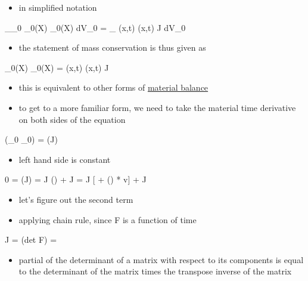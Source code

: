 \documentclass[11pt]{article}
\begin{document}
\begin{itemize}
\item in simplified notation
\end{itemize}
\int _{\omega_0} \rho_0(X) \phi_0(X) dV_0 = \int _{\omega} \rho(x,t) \phi(x,t) J dV_0
\begin{itemize}
\item the statement of mass conservation is thus given as
\end{itemize}
\rho_0(X) \phi_0(X) = \rho(x,t) \phi(x,t) J
\begin{itemize}
\item this is equivalent to other forms of \href{materialbalance.org}{material balance}
\item to get to a more familiar form, we need to take the material time derivative on both sides of the equation
\end{itemize}
 (\rho _0 \phi _0) =  (\rho \phi J)
\begin{itemize}
\item left hand side is constant
\end{itemize}
0 =  (\rho \phi J)
= J  (\rho \phi) + \rho \phi {} J 
= J [ + \nabla (\rho \phi) * v] + \rho \phi {} J
\begin{itemize}
\item let's figure out the second term
\item applying chain rule, since F is a function of time
\end{itemize}
 J =  (det F)
=  
\begin{itemize}
\item partial of the determinant of a matrix with respect to its components is equal to the determinant of the matrix times the transpose inverse of the matrix
\end{itemize}
\end{document}

